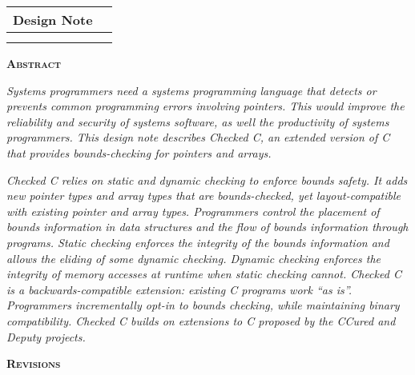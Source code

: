 \documentclass[]{article}
\date{}
\begin{document}
\begin{longtable}[c]{@{}ll@{}}
\toprule
Design Note &\tabularnewline
\midrule
\endhead
&\tabularnewline
\tabularnewline
\bottomrule
\end{longtable}

\textbf{\textsc{Abstract }}

\emph{Systems programmers need a systems programming language that
detects or prevents common programming errors involving pointers. This
would improve the reliability and security of systems software, as well
the productivity of systems programmers. This design note describes
Checked C, an extended version of C that provides bounds-checking for
pointers and arrays. }

\emph{Checked C relies on static and dynamic checking to enforce bounds
safety. It adds new pointer types and array types that are
bounds-checked, yet layout-compatible with existing pointer and array
types. Programmers control the placement of bounds information in data
structures and the flow of bounds information through programs. Static
checking enforces the integrity of the bounds information and allows the
eliding of some dynamic checking. Dynamic checking enforces the
integrity of memory accesses at runtime when static checking cannot.
Checked C is a backwards-compatible extension: existing C programs work
``as is''. Programmers incrementally opt-in to bounds checking, while
maintaining binary compatibility. Checked C builds on extensions to C
proposed by the CCured and Deputy projects.}

\textbf{\textsc{Revisions}}
\end{document}
